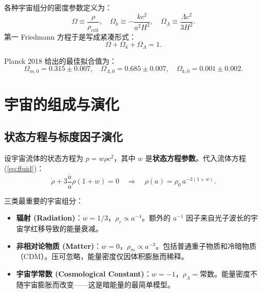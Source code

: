 \begin{definition}[密度参数]
各种宇宙组分的密度参数定义为：
\begin{equation}
    \boxed{\Omega \equiv \frac{\rho}{\rho_{\text{crit}}}}, \quad
    \Omega_k \equiv -\frac{k c^2}{a^2 H^2}, \quad
    \Omega_\Lambda \equiv \frac{\Lambda c^2}{3 H^2}.
    \label{eq:Omega}
\end{equation}
第一 Friedmann 方程于是写成紧凑形式：
\begin{equation}
    \boxed{\Omega + \Omega_k + \Omega_\Lambda = 1}.
    \label{eq:Omega_sum}
\end{equation}
\end{definition}

Planck 2018 给出的最佳拟合值为：
\begin{equation}
    \Omega_{m,0} = 0.315 \pm 0.007,\quad
    \Omega_{\Lambda,0} = 0.685 \pm 0.007,\quad
    \Omega_{k,0} = 0.001 \pm 0.002.
\end{equation}

\section{宇宙的组成与演化}
\label{sec:components}

\subsection{状态方程与标度因子演化}

设宇宙流体的状态方程为 $p = w \rho c^2$，其中 $w$ 是\textbf{状态方程参数}。代入流体方程 (\ref{eq:fluid})：
\begin{equation}
    \dot{\rho} + 3\frac{\dot{a}}{a}\rho(1+w) = 0
    \quad\Longrightarrow\quad
    \boxed{\rho(a) = \rho_0 \, a^{-3(1+w)}}.
    \label{eq:rho_evolution}
\end{equation}

三类最重要的宇宙组分：

\begin{definition}[宇宙组分]
\begin{itemize}
    \item \textbf{辐射 (Radiation)}：$w = 1/3$，$\rho_r \propto a^{-4}$。额外的 $a^{-1}$ 因子来自光子波长的宇宙学红移导致的能量衰减。
    \item \textbf{非相对论物质 (Matter)}：$w = 0$，$\rho_m \propto a^{-3}$。包括普通重子物质和冷暗物质（CDM）。压可忽略，能量密度仅因体积膨胀而稀释。
    \item \textbf{宇宙学常数 (Cosmological Constant)}：$w = -1$，$\rho_\Lambda = \text{常数}$。能量密度不随宇宙膨胀而改变——这是暗能量的最简单模型。
\end{itemize}
\end{definition}

